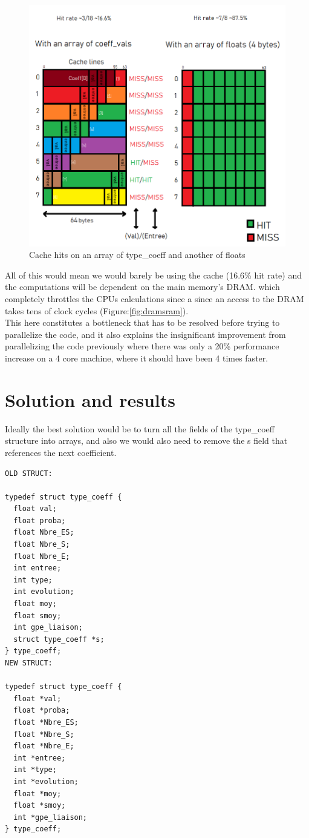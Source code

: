 \documentclass {article}
\begin{document}
\begin{figure}[H]
    \includegraphics[width=\linewidth]{plot/cachedistr.png}
    \caption{Cache hits on an array of type\_coeff and another of floats}
    \label{fig:cachedist}
\end{figure}

All of this would mean we would barely be using the cache (16.6\% hit rate)
and the computations will be dependent on the main memory's DRAM. which
completely throttles the CPUs calculations since a since an access to the DRAM
takes tens of clock cycles (Figure:\ref{fig:dramsram}).\\

This here constitutes a bottleneck that has to be resolved before trying to
parallelize the code, and it also explains the insignificant improvement from
parallelizing the code previously where there was only a 20\% performance
increase on a 4 core machine, where it should have been 4 times faster.

\section{Solution and results}
Ideally the best solution would be to turn all the fields of the type\_coeff 
structure into arrays, and also we would also need to remove the s field that
references the next coefficient.
\begin{lstlisting}[numbers=none,frame=none,xleftmargin=3em, multicols=2]
OLD STRUCT:

typedef struct type_coeff {
  float val;
  float proba;
  float Nbre_ES;
  float Nbre_S;
  float Nbre_E;
  int entree;
  int type;
  int evolution;
  float moy;
  float smoy;
  int gpe_liaison;
  struct type_coeff *s;
} type_coeff;
NEW STRUCT:

typedef struct type_coeff {
  float *val;
  float *proba;
  float *Nbre_ES;
  float *Nbre_S;
  float *Nbre_E;
  int *entree;
  int *type;
  int *evolution;
  float *moy;
  float *smoy;
  int *gpe_liaison;
} type_coeff;
\end{lstlisting}
\end{document}
